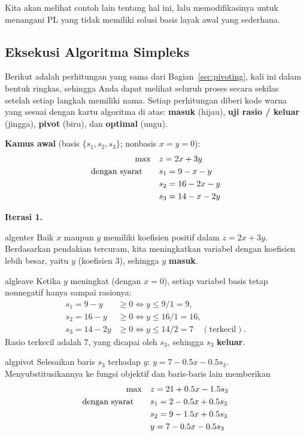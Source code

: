 Kita akan melihat contoh lain tentang hal ini, lalu memodifikasinya untuk menangani PL yang tidak memiliki solusi basis layak awal yang sederhana.

\subsection{Eksekusi Algoritma Simpleks}

Berikut adalah perhitungan yang sama dari Bagian~\ref{sec:pivoting}, kali ini dalam bentuk ringkas, sehingga Anda dapat melihat seluruh proses secara sekilas setelah setiap langkah memiliki nama. Setiap perhitungan diberi kode warna yang sesuai dengan kartu algoritma di atas: {\color{algenter}\textbf{masuk}} (hijau), {\color{algleave}\textbf{uji rasio / keluar}} (jingga), {\color{algpivot}\textbf{pivot}} (biru), dan {\color{algopt}\textbf{optimal}} (ungu).

\noindent\textbf{Kamus awal} (basis \(\{s_1,s_2,s_3\}\); nonbasis \(x=y=0\)):
\[
\begin{aligned}
\max\quad & z = 2x + 3y \\
\mbox{dengan syarat}\quad\quad  & s_1 = 9 - x - y \\
          & s_2 = 16 - 2x - y \\
          & s_3 = 14 - x - 2y
\end{aligned}
\]

\noindent\textbf{Iterasi 1.}
\begin{steppanel}{algenter}
 Baik \(x\) maupun \(y\) memiliki koefisien positif dalam \(z = 2x + 3y\). Berdasarkan pendakian tercuram, kita meningkatkan variabel dengan koefisien lebih besar, yaitu \(y\) (koefisien \(3\)), sehingga \(y\) \textbf{masuk}.
\end{steppanel}
\begin{steppanel}{algleave}
 Ketika \(y\) meningkat (dengan \(x=0\)), setiap variabel basis tetap nonnegatif hanya sampai rasionya:
\[
\begin{aligned}
s_1 = 9 - y   &\ge 0 \iff y \le 9/1  = 9,\\
s_2 = 16 - y  &\ge 0 \iff y \le 16/1 = 16,\\
s_3 = 14 - 2y &\ge 0 \iff y \le 14/2 = 7 \quad(\text{terkecil}).
\end{aligned}
\]
Rasio terkecil adalah \(7\), yang dicapai oleh \(s_3\), sehingga \(s_3\) \textbf{keluar}.
\end{steppanel}
\begin{steppanel}{algpivot}
 Selesaikan baris \(s_3\) terhadap \(y\): \(y = 7 - 0.5x - 0.5s_3\). Menyubstitusikannya ke fungsi objektif dan baris-baris lain memberikan
\[
\begin{aligned}
\max\quad & z = 21 + 0.5x - 1.5s_3 \\
\mbox{dengan syarat}\quad\quad  & s_1 = 2 - 0.5x + 0.5s_3 \\
          & s_2 = 9 - 1.5x + 0.5s_3 \\
          & y = 7 - 0.5x - 0.5s_3
\end{aligned}
\]
\end{steppanel}


